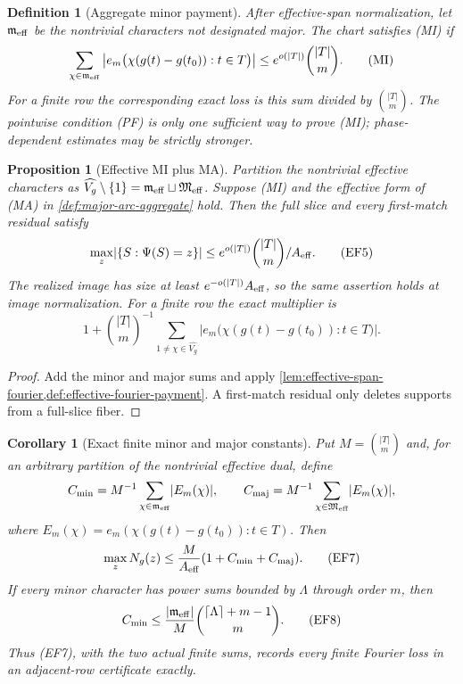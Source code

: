 \documentclass[12pt,a4paper]{amsart}
\numberwithin{equation}{section}
\newtheorem{proposition}[proposition]{Proposition}
\newtheorem{corollary}[corollary]{Corollary}
\newtheorem{definition}[definition]{Definition}
\theoremstyle{remark}
\newcommand{\abs}[1]{\lvert #1\rvert}
\newcommand{\ceil}[1]{\left\lceil #1\right\rceil}
\begin{document}
\begin{definition}[Aggregate minor payment]
\label{def:aggregate-minor-payment}
After effective-span normalization, let \(\mathfrak m_{\rm eff}\) be the
nontrivial characters not designated major.  The chart satisfies
\textup{(MI)} if
\[
 \sum_{\chi\in\mathfrak m_{\rm eff}}
 \left|e_m\bigl(\chi(g(t)-g(t_0)):t\in T\bigr)\right|
 \le e^{o(\abs T)}\binom{\abs T}m.                 \tag{MI}
\]
For a finite row the corresponding exact loss is this sum divided by
\(\binom{\abs T}m\).  The pointwise condition \textup{(PF)} is only one
sufficient way to prove \textup{(MI)}; phase-dependent estimates may be
strictly stronger.
\end{definition}

\begin{proposition}[Effective MI plus MA]
\label{prop:effective-mi-ma-flatness}
Partition the nontrivial effective characters as
\(\widehat{V_g}\setminus\{1\}
=\mathfrak m_{\rm eff}\sqcup\mathfrak M_{\rm eff}\).  Suppose
\textup{(MI)} and the effective form of \textup{(MA)} in
\cref{def:major-arc-aggregate} hold.
Then the full slice and every first-match residual satisfy
\[
 \max_z\abs{\{S:\Psi(S)=z\}}
 \le e^{o(\abs T)}\binom{\abs T}m/A_{\rm eff}.     \tag{EF5}
\]
The realized image has size at least
\(e^{-o(\abs T)}A_{\rm eff}\), so the same assertion holds at image
normalization.  For a finite row the exact multiplier is
\[
 1+\binom{\abs T}m^{-1}
 \sum_{1\ne\chi\in\widehat{V_g}}
 \left|e_m\bigl(\chi(g(t)-g(t_0)):t\in T\bigr)\right|.
 \tag{EF6}
\]
\end{proposition}

\begin{proof}
Add the minor and major sums and apply
\cref{lem:effective-span-fourier,def:effective-fourier-payment}.  A
first-match residual only deletes supports from a full-slice fiber.
\end{proof}

\begin{corollary}[Exact finite minor and major constants]
\label{cor:exact-finite-fourier-constants}
Put \(M=\binom{\abs T}m\) and, for an arbitrary partition of the
nontrivial effective dual, define
\[
 C_{\rm min}=M^{-1}\sum_{\chi\in\mathfrak m_{\rm eff}}\abs{E_m(\chi)},
 \qquad
 C_{\rm maj}=M^{-1}\sum_{\chi\in\mathfrak M_{\rm eff}}\abs{E_m(\chi)},
\]
where
\(E_m(\chi)=e_m(\chi(g(t)-g(t_0)):t\in T)\).  Then
\[
              \max_zN_g(z)\le
              \frac{M}{A_{\rm eff}}
              (1+C_{\rm min}+C_{\rm maj}).          \tag{EF7}
\]
If every minor character has power sums bounded by \(\Lambda\) through
order \(m\), then
\[
 C_{\rm min}\le
 \frac{\abs{\mathfrak m_{\rm eff}}}{M}
 \binom{\ceil\Lambda+m-1}{m}.                      \tag{EF8}
\]
Thus \textup{(EF7)}, with the two actual finite sums, records every finite
Fourier loss in an adjacent-row certificate exactly.
\end{corollary}
\end{document}
